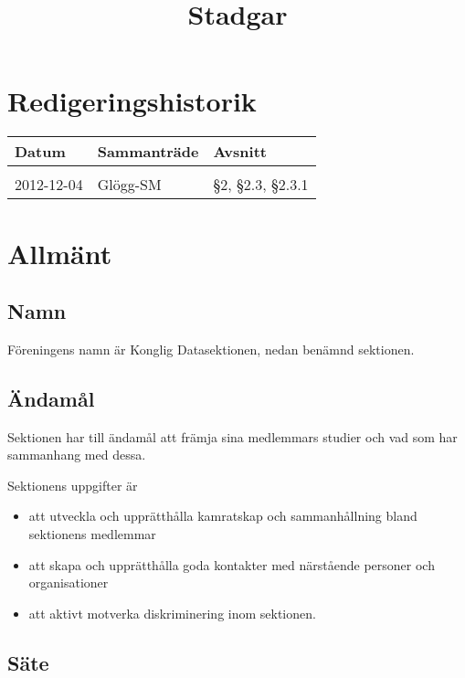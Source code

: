 \documentclass{dgovdoc}
\title{Stadgar}
\begin{document}
\maketitle

\addtocounter{section}{-1}
\section{Redigeringshistorik}

\begin{table}[h!]
  \begin{tabular}{l l l}
    Datum & Sammanträde & Avsnitt \\
    \hline \\
    2012-12-04 & Glögg-SM & \S2, \S2.3, \S2.3.1 \\
  \end{tabular}
\end{table}

\section{Allmänt}

\subsection{Namn}
\label{sec:namn}

Föreningens namn är Konglig Datasektionen, nedan benämnd sektionen.

\subsection{Ändamål}

Sektionen har till ändamål att främja sina medlemmars studier och vad som har
sammanhang med dessa.

Sektionens uppgifter är

\begin{itemize}
  \item att utveckla och upprätthålla kamratskap och sammanhållning bland
    sektionens medlemmar
  \item att skapa och upprätthålla goda kontakter med närstående personer och
    organisationer
  \item att aktivt motverka diskriminering inom sektionen.
\end{itemize}

\subsection{Säte}
\end{document}
